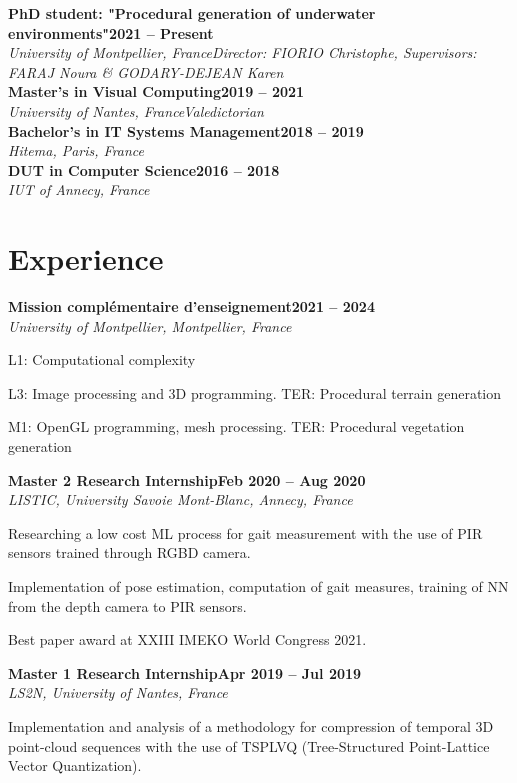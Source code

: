 \documentclass[letterpaper,10pt]{article}
\newcommand{\heading}[2]{
  \hspace{10pt}#1\hfill#2\\
}
\newcommand{\headingBf}[2]{
  \heading{\textbf{#1}}{\textbf{#2}}
}
\newcommand{\headingIt}[2]{
  \heading{\textit{#1}}{\textit{#2}}
}
\newenvironment{resume_list}{
  \vspace{-7pt}
  \begin{itemize}[itemsep=-2px, parsep=1pt, leftmargin=30pt]
}{
  \end{itemize}
}
\begin{document}
  \headingBf{PhD student: "Procedural generation of underwater environments"}{2021 -- Present}
  \headingIt{University of Montpellier, France}{Director: FIORIO Christophe, Supervisors: FARAJ Noura \& GODARY-DEJEAN Karen}

  \headingBf{Master's in Visual Computing}{2019 -- 2021}
  \headingIt{University of Nantes, France}{Valedictorian}

  \headingBf{Bachelor's in IT Systems Management}{2018 -- 2019}
  \headingIt{Hitema, Paris, France}{}

  \headingBf{DUT in Computer Science}{2016 -- 2018}
  \headingIt{IUT of Annecy, France}{}


  \section{Experience}

  \headingBf{Mission complémentaire d'enseignement}{2021 -- 2024}
  \headingIt{University of Montpellier, Montpellier, France}{}
  \begin{resume_list}
    \item L1: Computational complexity
    \item L3: Image processing and 3D programming. TER: Procedural terrain generation
    \item M1: OpenGL programming, mesh processing. TER: Procedural vegetation generation
  \end{resume_list}

  \headingBf{Master 2 Research Internship}{Feb 2020 -- Aug 2020}
  \headingIt{LISTIC, University Savoie Mont-Blanc, Annecy, France}{}
  \begin{resume_list}
    \item Researching a low cost ML process for gait measurement with the use of PIR sensors trained through RGBD camera.
    \item Implementation of pose estimation, computation of gait measures, training of NN from the depth camera to PIR sensors.
    \item Best paper award at XXIII IMEKO World Congress 2021.
  \end{resume_list}

  \headingBf{Master 1 Research Internship}{Apr 2019 -- Jul 2019}
  \headingIt{LS2N, University of Nantes, France}{}
  \begin{resume_list}
    \item Implementation and analysis of a methodology for compression of temporal 3D point-cloud sequences with the use of TSPLVQ (Tree-Structured Point-Lattice Vector Quantization).
  \end{resume_list}
\end{document}
